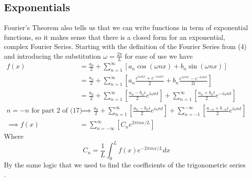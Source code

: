 \documentclass[12pt]{article}
\begin{document}
    \subsection{Exponentials}
    Fourier's Theorem also tells us that we can write functions in term of exponential functions, so it makes sense that there is a closed form for an exponential, complex Fourier Series. Starting with the definition of the Fourier Series from (4) and introducing the substitution $\omega = \frac{2\pi}{L}$ for ease of use we have
    \begin{align}
        f(x) &= \frac{a_0}{2} + \sum_{n=1}^{\infty}\left[ a_n\cos\left( \omega n x \right) + b_n\sin\left( \omega n x \right) \right] \\
             &= \frac{a_0}{2} + \sum_{n=1}^{\infty}\left[ a_n\frac{e^{i\omega n x}+e^{-i\omega n x}}{2} + b_n\frac{e^{i\omega n x}-e^{-i\omega n x}}{2i}\right] \\
             &= \frac{a_0}{2} + \sum_{n=1}^{\infty}\left[ \frac{a_n-b_ni}{2} e^{i\omega n t} \right] +\sum_{n=1}^{\infty}\left[ \frac{a_n+b_ni}{2}e^{-i\omega n t} \right] \\
        n = -n \text{ for part 2 of (17)} &\implies \frac{a_0}{2} + \sum_{n=1}^{\infty}\left[ \frac{a_n-b_ni}{2} e^{i\omega n t} \right] +\sum_{n=-1}^{-\infty}\left[ \frac{a_{-n}+b_{-n}i}{2}e^{i\omega n t} \right] \\
        \implies f(x) &= \sum_{n = -\infty}^{\infty}\left[ C_n e^{2\pi i n x / L} \right]
    \end{align}
    Where \[C_n = \frac{1}{L} \int_0^Lf(x)e^{-2\pi i n x / L} dx\] By the same logic that we used to find the coefficients of the trigonometric series \cite{reed}.
\end{document}
